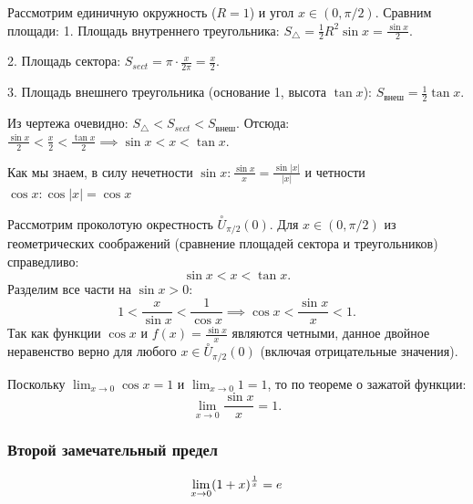 \begin{Proof}
Рассмотрим единичную окружность ($R=1$) и угол $x \in (0, \pi/2)$.
Сравним площади:
1. Площадь внутреннего треугольника: $S_{\triangle} = \frac{1}{2} R^2 \sin x = \frac{\sin x}{2}$.

2. Площадь сектора: $S_{sect} = \pi \cdot \frac{x}{2\pi } = \frac{x}{2}$.

3. Площадь внешнего треугольника (основание 1, высота $\tan x$): $S_{\text{внеш}} = \frac{1}{2} \tan x$.

Из чертежа очевидно: $S_{\triangle} < S_{sect} < S_{\text{внеш}}$.
Отсюда: $\frac{\sin x}{2} < \frac{x}{2} < \frac{\tan x}{2} \implies \sin x < x < \tan x$.
\end{Proof}
\begin{Proof}[]
Как мы знаем, в силу нечетности $\sin x : \frac{\sin x}{x} = \frac{\sin |x|}{|x|}$ и четности $\cos x : \cos |x| = \cos x$

Рассмотрим проколотую окрестность $\overset{\circ}{U}_{\pi/2}(0)$. 
Для $x \in (0, \pi/2)$ из геометрических соображений (сравнение площадей сектора и треугольников) справедливо:
\[ \sin x < x < \tan x. \]
Разделим все части на $\sin x > 0$:
\[ 1 < \frac{x}{\sin x} < \frac{1}{\cos x} \implies \cos x < \frac{\sin x}{x} < 1. \]
Так как функции $\cos x$ и $f(x) = \frac{\sin x}{x}$ являются четными, данное двойное неравенство верно для любого $x \in \overset{\circ}{U}_{\pi/2}(0)$ (включая отрицательные значения).

Поскольку $\lim_{x \to 0} \cos x = 1$ и $\lim_{x \to 0} 1 = 1$, то по теореме о зажатой функции:
\[ \lim_{x \to 0} \frac{\sin x}{x} = 1. \]
\end{Proof}

\subsubsection{Второй замечательный предел}

\begin{theorem}
\[
    \lim\limits_{x \to 0} (1 + x)^\frac{1}{x} = e
\]
\end{theorem}

